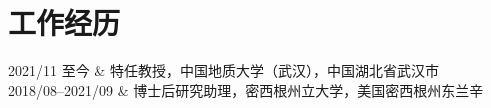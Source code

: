 \section{工作经历}

\begin{EntriesTable}{0.18}{0.02}{0.80}
2021/11 至今 & 特任教授，中国地质大学（武汉），中国湖北省武汉市 \\
2018/08--2021/09 & 博士后研究助理，密西根州立大学，美国密西根州东兰辛 \\
\end{EntriesTable}
